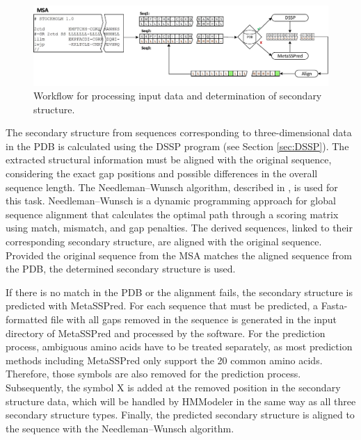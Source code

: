 \begin{figure}[ht]
	\begin{center}
		\includegraphics[width=\textwidth]{fig/ablaufMSA}
	\end{center}
	\caption[Workflow for processing input data.]{Workflow for processing input data and determination of secondary structure.}
	\label{fig:flowReadMSA}
\end{figure}

The secondary structure from sequences corresponding to three-dimensional data in the \ac{PDB} is calculated using the \ac{DSSP} program (see Section \ref{sec:DSSP}). The extracted structural information must be aligned with the original sequence, considering the exact gap positions and possible differences in the overall sequence length.  
The \mbox{Needleman--Wunsch} algorithm, described in \cite[p.\,19--21]{Durbin.1998}, is used for this task. 
Needleman--Wunsch is a dynamic programming approach for global sequence alignment that calculates the optimal path through a scoring matrix using match, mismatch, and gap penalties.
The derived sequences, linked to their corresponding secondary structure, are aligned with the original sequence. Provided the original sequence from the \ac{MSA} matches the aligned sequence from the \ac{PDB}, the determined secondary structure is used. 

If there is no match in the \ac{PDB} or the alignment fails, the secondary structure is predicted with MetaSSPred. For each sequence that must be predicted, a Fasta-formatted file with all gaps removed in the sequence is generated in the input directory of MetaSSPred and processed by the software. For the prediction process, ambiguous amino acids have to be treated separately, as most prediction methods including MetaSSPred only support the 20 common amino acids. Therefore, those symbols are also  removed for the prediction process. 
Subsequently, the symbol X is added at the removed position in the secondary structure data, which will be handled by HMModeler in the same way as all three secondary structure types.
Finally, the predicted secondary structure is aligned to the sequence with the Needleman--Wunsch algorithm. 

